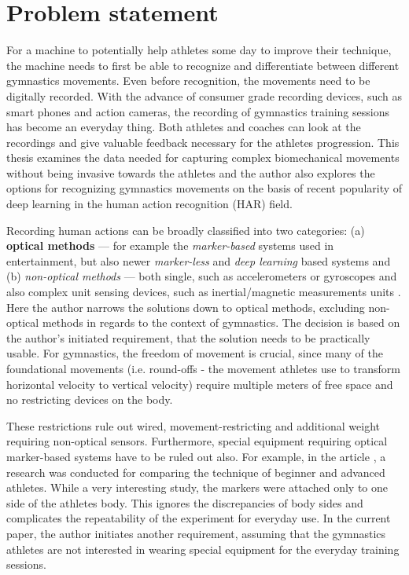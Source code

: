 \section{Problem statement}

For a machine to potentially help athletes some day to improve their technique, the machine needs to first be able to recognize and differentiate between different gymnastics movements. Even before recognition, the movements need to be digitally recorded. With the advance of consumer grade recording devices, such as smart phones and action cameras, the recording of gymnastics training sessions has become an everyday thing. Both athletes and coaches can look at the recordings and give valuable feedback necessary for the athletes progression. This thesis examines the data needed for capturing complex biomechanical movements without being invasive towards the athletes and the author also explores the options for recognizing gymnastics movements on the basis of recent popularity of deep learning in the human action recognition (HAR) field.

Recording human actions can be broadly classified into two categories: (a) \textbf{optical methods} --- for example the \textit{marker-based} systems used in entertainment, but also newer \textit{marker-less} and \textit{deep learning} based systems \cite{Elhayek_2015_CVPR} and (b) \textit{non-optical methods} --- both single, such
as accelerometers or gyroscopes and also complex unit sensing devices, such as inertial/magnetic measurements units \cite{7567551}. Here the author narrows the solutions down to optical methods, excluding non-optical methods in regards to the context of gymnastics. The decision is based on the author's initiated requirement, that the solution needs to be practically usable. For gymnastics, the freedom of movement is crucial, since many of the foundational movements (i.e. round-offs - the movement athletes use to transform horizontal velocity to vertical velocity) require multiple meters of free space and no restricting devices on the body.

These restrictions rule out wired, movement-restricting and additional weight requiring non-optical sensors. Furthermore, special equipment requiring optical marker-based systems have to be ruled out also. For example, in the article \cite{Burgess2001KINEMATICAO}, a research was conducted for comparing the technique of beginner and advanced athletes. While a very interesting study, the markers were attached only to one side of the athletes body. This ignores the discrepancies of body sides and complicates the repeatability of the experiment for everyday use. In the current paper, the author initiates another requirement, assuming that the gymnastics athletes are not interested in wearing special equipment for the everyday training sessions.

